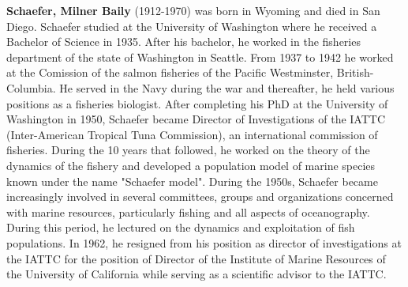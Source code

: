 \textbf{Schaefer, Milner Baily} (1912-1970) was born in Wyoming and died in San Diego. Schaefer studied at the University of Washington where he received a Bachelor of Science in 1935. After his bachelor, he worked in the fisheries department of the state of Washington in Seattle. From 1937 to 1942 he worked at the Comission of the salmon fisheries of the Pacific Westminster, British-Columbia. He served in the Navy during the war and thereafter, he held various positions as a fisheries biologist. After completing his PhD at the University of Washington in 1950, Schaefer became Director of Investigations of the IATTC (Inter-American Tropical Tuna Commission), an international commission of fisheries. During the 10 years that followed, he worked on the theory of the dynamics of the fishery and developed a population model of marine species known under the name "Schaefer model". During the 1950s, Schaefer became increasingly involved in several committees, groups and organizations concerned with marine resources, particularly fishing and all aspects of oceanography. During this period, he lectured on the dynamics and exploitation of fish populations. In 1962, he resigned from his position as director of investigations at the IATTC for the position of Director of the Institute of Marine Resources of the University of California while serving as a scientific advisor to the IATTC.

